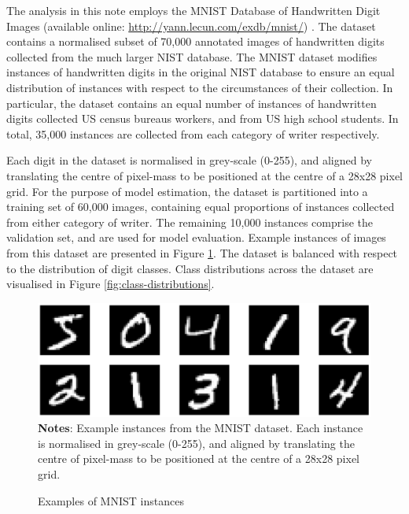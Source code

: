
The analysis in this note employs the MNIST Database of Handwritten Digit Images (available online: \url{http://yann.lecun.com/exdb/mnist/}) \cite{lecun1998gradient}. The dataset contains a normalised subset of 70,000 annotated images of handwritten digits collected from the much larger NIST database.
The MNIST dataset modifies instances of handwritten digits in the original NIST database to ensure an equal distribution of instances with respect to the circumstances of their collection.
In particular, the dataset contains an equal number of instances of handwritten digits collected US census bureaus workers, and from US high school students. In total, 35,000 instances are collected from each category of writer respectively.

Each digit in the dataset is normalised in grey-scale (0-255), and aligned by translating the centre of pixel-mass to be positioned at the centre of a 28x28 pixel grid. 
For the purpose of model estimation, the dataset is partitioned into a training set of 60,000 images, containing equal proportions of instances collected from either category of writer.
The remaining 10,000 instances comprise the validation set, and are used for model evaluation.
Example instances of images from this dataset are presented in Figure \ref{fig:instance-examples}.
The dataset is balanced with respect to the distribution of digit classes. Class distributions across the dataset are visualised in Figure \ref{fig:class-distributions}.

\begin{figure}
    \caption{Examples of MNIST instances}
	\label{fig:instance-examples}
	\includegraphics[width=1.0\textwidth]{graphics/instance_examples.pdf}
    \textbf{Notes}: Example instances from the MNIST dataset. Each instance is normalised in grey-scale (0-255), and aligned by translating the centre of pixel-mass to be positioned at the centre of a 28x28 pixel grid. 
\end{figure}

